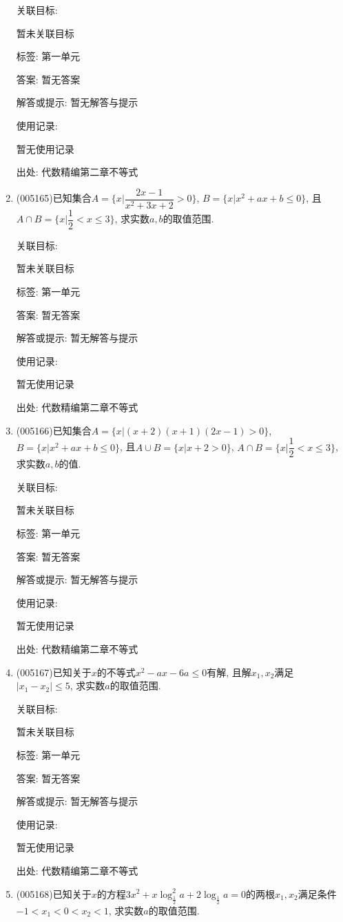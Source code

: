 \documentclass[10pt,a4paper]{article}
\begin{document}
\begin{enumerate}[1.]
关联目标:

暂未关联目标



标签: 第一单元

答案: 暂无答案

解答或提示: 暂无解答与提示

使用记录:

暂无使用记录


出处: 代数精编第二章不等式
\item { (005165)}已知集合$A=\{x|\dfrac{2x-1}{x^2+3x+2}>0\}$, $B=\{x|x^2+ax+b\le 0\}$, 且$A\cap B=\{x|\dfrac 12<x\le 3\}$, 求实数$a,b$的取值范围.


关联目标:

暂未关联目标



标签: 第一单元

答案: 暂无答案

解答或提示: 暂无解答与提示

使用记录:

暂无使用记录


出处: 代数精编第二章不等式
\item { (005166)}已知集合$A=\{x|(x+2)(x+1)(2x-1)>0\}$, $B=\{x|x^2+ax+b\le 0\}$, 且$A\cup B=\{x|x+2 >0\}$, $A\cap B=\{x|\dfrac 12<x\le 3\}$, 求实数$a,b$的值.


关联目标:

暂未关联目标



标签: 第一单元

答案: 暂无答案

解答或提示: 暂无解答与提示

使用记录:

暂无使用记录


出处: 代数精编第二章不等式
\item { (005167)}已知关于$x$的不等式$x^2-ax-6a\le 0$有解, 且解$x_1,x_2$满足$|x_1-x_2|\le 5$, 求实数$a$的取值范围.


关联目标:

暂未关联目标



标签: 第一单元

答案: 暂无答案

解答或提示: 暂无解答与提示

使用记录:

暂无使用记录


出处: 代数精编第二章不等式
\item { (005168)}已知关于$x$的方程$3x^2+x\log_{\frac 12}^2a+2\log_{\frac 12}a=0$的两根$x_1,x_2$满足条件$-1<x_1<0<x_2<1$, 求实数$a$的取值范围.



\end{enumerate}
\end{document}
